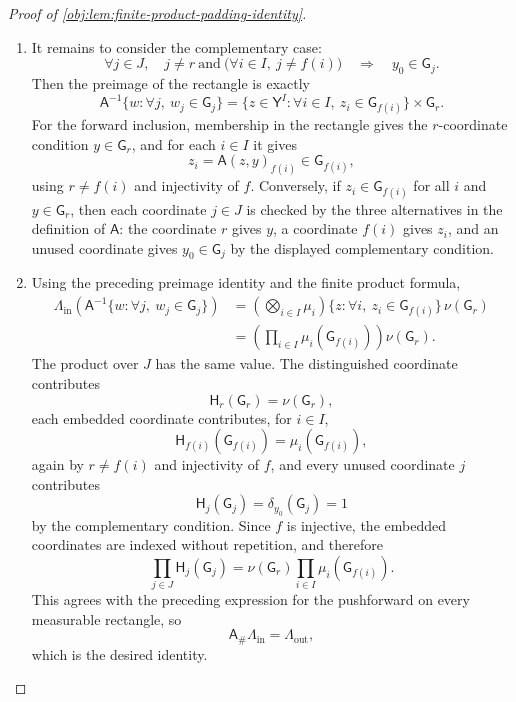 \documentclass[11pt]{article}
\begin{document}
\begin{proof}[Proof of \cref{obj:lem:finite-product-padding-identity}]
\begin{enumerate}
\item
It remains to consider the complementary case:
\[
\forall j\in J,\quad
j\ne r\ \text{and}\ \bigl(\forall i\in I,\ j\ne f(i)\bigr)
\quad\Longrightarrow\quad
y_0\in\mathsf G_j .
\]
Then the preimage of the rectangle is exactly
\[
\mathsf A^{-1}\{w:\forall j,\ w_j\in\mathsf G_j\}
=
\{z\in\mathsf Y^I:\forall i\in I,\ z_i\in\mathsf G_{f(i)}\}
\times \mathsf G_r .
\]
For the forward inclusion, membership in the rectangle gives the \(r\)-coordinate condition
\(y\in\mathsf G_r\), and for each \(i\in I\) it gives
\[
z_i=\mathsf A(z,y)_{f(i)}\in\mathsf G_{f(i)},
\]
using \(r\ne f(i)\) and injectivity of \(f\). Conversely, if \(z_i\in\mathsf G_{f(i)}\) for all
\(i\) and \(y\in\mathsf G_r\), then each coordinate \(j\in J\) is checked by the three alternatives
in the definition of \(\mathsf A\): the coordinate \(r\) gives \(y\), a coordinate \(f(i)\) gives
\(z_i\), and an unused coordinate gives \(y_0\in\mathsf G_j\) by the displayed complementary
condition.

\item
Using the preceding preimage identity and the finite product formula,
\[
\begin{aligned}
\Lambda_{\mathrm{in}}\!\left(\mathsf A^{-1}
  \{w:\forall j,\ w_j\in\mathsf G_j\}\right)
&=
\left(\bigotimes_{i\in I}\mu_i\right)
  \{z:\forall i,\ z_i\in\mathsf G_{f(i)}\}\,
  \nu(\mathsf G_r) \\
&=
\left(\prod_{i\in I}\mu_i(\mathsf G_{f(i)})\right)\nu(\mathsf G_r).
\end{aligned}
\]
The product over \(J\) has the same value. The distinguished coordinate contributes
\[
\mathsf H_r(\mathsf G_r)=\nu(\mathsf G_r),
\]
each embedded coordinate contributes, for \(i\in I\),
\[
\mathsf H_{f(i)}(\mathsf G_{f(i)})=\mu_i(\mathsf G_{f(i)}),
\]
again by \(r\ne f(i)\) and injectivity of \(f\), and every unused coordinate \(j\) contributes
\[
\mathsf H_j(\mathsf G_j)=\delta_{y_0}(\mathsf G_j)=1
\]
by the complementary condition. Since \(f\) is injective, the embedded coordinates are indexed
without repetition, and therefore
\[
\prod_{j\in J}\mathsf H_j(\mathsf G_j)
=
\nu(\mathsf G_r)\prod_{i\in I}\mu_i(\mathsf G_{f(i)}).
\]
This agrees with the preceding expression for the pushforward on every measurable rectangle, so
\[
\mathsf A_\#\Lambda_{\mathrm{in}}=\Lambda_{\mathrm{out}},
\]
which is the desired identity.
\end{enumerate}
\end{proof}
\end{document}
